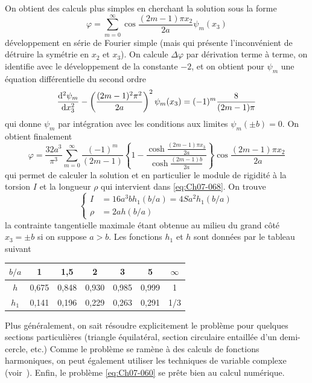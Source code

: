On obtient des calculs plus simples en cherchant la solution sous la forme 
\begin{equation}
    \varphi = \sum_{m=0}^{\infty} \cos \frac{(2m-1) \pi x_2}{2a} \psi_m (x_3)    
    \label{eq:Ch07-089}
\end{equation}
développement en série de Fourier simple (mais qui présente l'inconvénient de détruire la symétrie en $x_2$ et $x_3$).
On calcule $\Delta \varphi$ par dérivation terme à terme, on  identifie  avec le développement de la constante $-2$, et on  obtient pour $\psi_m$ une équation différentielle du second ordre
\begin{displaymath}
    \frac{\mathrm{d}^2 \psi_m}{\mathrm{d} x_3^2} - \left( \frac{(2m-1)^2\pi^2}{2a} \right)^2 \psi_m (x_3) = (-1)^m \frac{8}{(2m-1)\pi}
\end{displaymath}
qui donne $\psi_m$ par intégration avec les conditions aux limites $\psi_m(\pm b)=0$.
On obtient finalement
\begin{equation}
    \varphi = \frac{32a^3}{\pi^3} \sum_{m=0}^{\infty} \frac{(-1)^m}{(2m-1)} \left\{ 1 - \frac{\cosh \frac{(2m-1)\pi x_3}{2a}}{\cosh \frac{(2m-1)b}{2a}} \right\} \cos \frac{(2m-1)\pi x_2}{2a}
    \label{eq:Ch07-090}
\end{equation}
qui permet de calculer la solution et en particulier le module de rigidité à la torsion $I$ et la longueur $\rho$ qui intervient dans \eqref{eq:Ch07-068}.
On trouve 
\begin{equation}
    \left\{
    \begin{aligned}
        I &= 16 a^3 b h_1 (b/a) = 4 S a^2 h_1 (b/a) \\
        \rho &= 2 a h (b/a)
    \end{aligned}
    \right.
    \label{eq:Ch07-091}
\end{equation}
la contrainte tangentielle maximale étant obtenue au milieu du grand côté $x_3 = \pm b$ si on suppose $a>b$.
Les fonctions $h_1$ et $h$ sont données par le tableau suivant 
\begin{center}
\begin{tabular}{c|c|c|c|c|c|c}
    $b/a$ & 1 & 1,5 & 2 & 3 & 5 & $\infty$ \\ \hline
    $h$ & 0,675 & 0,848 & 0,930 & 0,985 & 0,999 & 1 \\ \hline
    $h_1$ & 0,141 & 0,196 & 0,229 & 0,263 & 0,291 & 1/3
\end{tabular}
\end{center}

Plus généralement, on sait résoudre explicitement le problème pour quelques sections particulières (triangle équilatéral, section circulaire entaillée d'un demi-cercle, etc.)
Comme le problème se ramène à des calculs de fonctions harmoniques, on peut également utiliser les techniques de variable complexe (voir~\cite{Love-44,Muskhelishvili-53}).
Enfin, le problème \eqref{eq:Ch07-060} se prête bien au calcul numérique.

